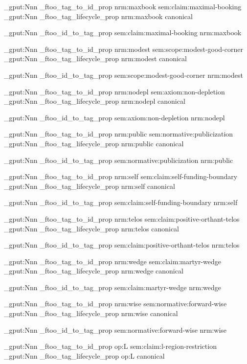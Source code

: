\prop_gput:Nnn \g_ftoo_tag_to_id_prop { nrm:maxbook } { sem:claim:maximal-booking }
\prop_gput:Nnn \g_ftoo_tag_lifecycle_prop { nrm:maxbook } { canonical }

\prop_gput:Nnn \g_ftoo_id_to_tag_prop { sem:claim:maximal-booking } { nrm:maxbook }


\prop_gput:Nnn \g_ftoo_tag_to_id_prop { nrm:modest } { sem:scope:modest-good-corner }
\prop_gput:Nnn \g_ftoo_tag_lifecycle_prop { nrm:modest } { canonical }

\prop_gput:Nnn \g_ftoo_id_to_tag_prop { sem:scope:modest-good-corner } { nrm:modest }


\prop_gput:Nnn \g_ftoo_tag_to_id_prop { nrm:nodepl } { sem:axiom:non-depletion }
\prop_gput:Nnn \g_ftoo_tag_lifecycle_prop { nrm:nodepl } { canonical }

\prop_gput:Nnn \g_ftoo_id_to_tag_prop { sem:axiom:non-depletion } { nrm:nodepl }


\prop_gput:Nnn \g_ftoo_tag_to_id_prop { nrm:public } { sem:normative:publicization }
\prop_gput:Nnn \g_ftoo_tag_lifecycle_prop { nrm:public } { canonical }

\prop_gput:Nnn \g_ftoo_id_to_tag_prop { sem:normative:publicization } { nrm:public }


\prop_gput:Nnn \g_ftoo_tag_to_id_prop { nrm:self } { sem:claim:self-funding-boundary }
\prop_gput:Nnn \g_ftoo_tag_lifecycle_prop { nrm:self } { canonical }

\prop_gput:Nnn \g_ftoo_id_to_tag_prop { sem:claim:self-funding-boundary } { nrm:self }


\prop_gput:Nnn \g_ftoo_tag_to_id_prop { nrm:telos } { sem:claim:positive-orthant-telos }
\prop_gput:Nnn \g_ftoo_tag_lifecycle_prop { nrm:telos } { canonical }

\prop_gput:Nnn \g_ftoo_id_to_tag_prop { sem:claim:positive-orthant-telos } { nrm:telos }


\prop_gput:Nnn \g_ftoo_tag_to_id_prop { nrm:wedge } { sem:claim:martyr-wedge }
\prop_gput:Nnn \g_ftoo_tag_lifecycle_prop { nrm:wedge } { canonical }

\prop_gput:Nnn \g_ftoo_id_to_tag_prop { sem:claim:martyr-wedge } { nrm:wedge }


\prop_gput:Nnn \g_ftoo_tag_to_id_prop { nrm:wise } { sem:normative:forward-wise }
\prop_gput:Nnn \g_ftoo_tag_lifecycle_prop { nrm:wise } { canonical }

\prop_gput:Nnn \g_ftoo_id_to_tag_prop { sem:normative:forward-wise } { nrm:wise }


\prop_gput:Nnn \g_ftoo_tag_to_id_prop { op:L } { sem:claim:l-region-restriction }
\prop_gput:Nnn \g_ftoo_tag_lifecycle_prop { op:L } { canonical }

